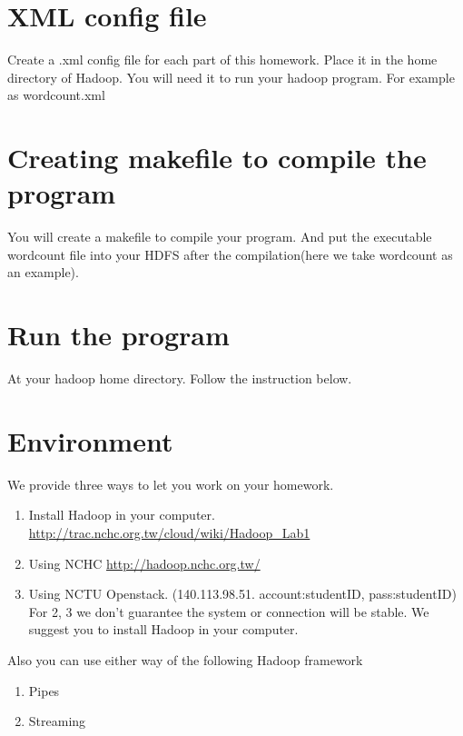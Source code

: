 \documentclass[a4paper,10pt]{article}
\begin{document}
\section{XML config file}
Create a .xml config file for each part of this homework. Place it in the home directory of Hadoop.
You will need it to run your hadoop program. For example as wordcount.xml

\lstset{
  language=XML,
  frame=single,
  showspaces=false,
  showstringspaces=false,
  basicstyle=\ttfamily
}


\section{Creating makefile to compile the program}
You will create a makefile to compile your program.
And put the executable wordcount file into your HDFS after the compilation(here we take wordcount as an example).
\lstset{
  language=Makefile,
  frame=single,
  showspaces=false,
  showstringspaces=false,
  basicstyle=\ttfamily
}


\section{Run the program}
At your hadoop home directory. Follow the instruction below.
\lstset{
  language=C++,
  frame=single,
  showspaces=false,
  showstringspaces=false,
  basicstyle=\ttfamily
}


\section{Environment}
We provide three ways to let you work on your homework.
\begin{enumerate}
\item Install Hadoop in your computer. \url{http://trac.nchc.org.tw/cloud/wiki/Hadoop_Lab1}
\item Using NCHC \url{http://hadoop.nchc.org.tw/}
\item Using NCTU Openstack. (140.113.98.51. account:studentID, pass:studentID)
For 2, 3 we don't guarantee the system or connection will be stable. We suggest you to install Hadoop in your computer.
\end{enumerate}
Also you can use either way of the following Hadoop framework
\begin{enumerate}
\item Pipes
\item Streaming
\end{enumerate}
\end{document}
